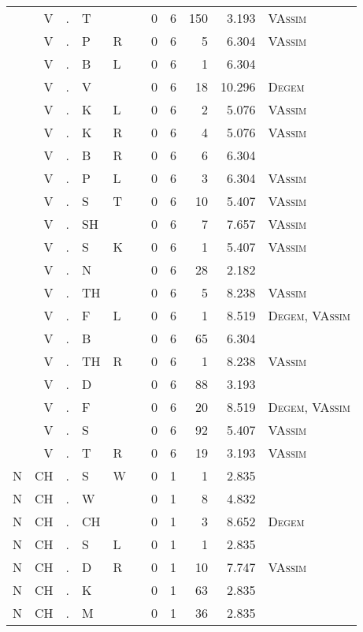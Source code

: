 \begin{longtable}{r@{ } r@{ } c@{ } l@{ } l@{ } l@{ } r r r r l }
 & V & . & T &  &  & 0 & 6 & 150 & 3.193 & \textsc{VAssim} \\
 & V & . & P & R &  & 0 & 6 & 5 & 6.304 & \textsc{VAssim} \\
 & V & . & B & L &  & 0 & 6 & 1 & 6.304 &  \\
 & V & . & V &  &  & 0 & 6 & 18 & 10.296 & \textsc{Degem} \\
 & V & . & K & L &  & 0 & 6 & 2 & 5.076 & \textsc{VAssim} \\
 & V & . & K & R &  & 0 & 6 & 4 & 5.076 & \textsc{VAssim} \\
 & V & . & B & R &  & 0 & 6 & 6 & 6.304 &  \\
 & V & . & P & L &  & 0 & 6 & 3 & 6.304 & \textsc{VAssim} \\
 & V & . & S & T &  & 0 & 6 & 10 & 5.407 & \textsc{VAssim} \\
 & V & . & SH &  &  & 0 & 6 & 7 & 7.657 & \textsc{VAssim} \\
 & V & . & S & K &  & 0 & 6 & 1 & 5.407 & \textsc{VAssim} \\
 & V & . & N &  &  & 0 & 6 & 28 & 2.182 &  \\
 & V & . & TH &  &  & 0 & 6 & 5 & 8.238 & \textsc{VAssim} \\
 & V & . & F & L &  & 0 & 6 & 1 & 8.519 & \textsc{Degem}, \textsc{VAssim} \\
 & V & . & B &  &  & 0 & 6 & 65 & 6.304 &  \\
 & V & . & TH & R &  & 0 & 6 & 1 & 8.238 & \textsc{VAssim} \\
 & V & . & D &  &  & 0 & 6 & 88 & 3.193 &  \\
 & V & . & F &  &  & 0 & 6 & 20 & 8.519 & \textsc{Degem}, \textsc{VAssim} \\
 & V & . & S &  &  & 0 & 6 & 92 & 5.407 & \textsc{VAssim} \\
 & V & . & T & R &  & 0 & 6 & 19 & 3.193 & \textsc{VAssim} \\
N & CH & . & S & W &  & 0 & 1 & 1 & 2.835 &  \\
N & CH & . & W &  &  & 0 & 1 & 8 & 4.832 &  \\
N & CH & . & CH &  &  & 0 & 1 & 3 & 8.652 & \textsc{Degem} \\
N & CH & . & S & L &  & 0 & 1 & 1 & 2.835 &  \\
N & CH & . & D & R &  & 0 & 1 & 10 & 7.747 & \textsc{VAssim} \\
N & CH & . & K &  &  & 0 & 1 & 63 & 2.835 &  \\
N & CH & . & M &  &  & 0 & 1 & 36 & 2.835 &  \\

\end{longtable}
